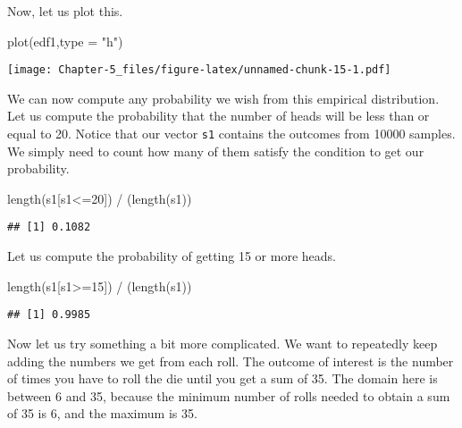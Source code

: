 \documentclass[
]{article}
\newenvironment{Shaded}{\begin{snugshade}}{\end{snugshade}}
\newcommand{\AttributeTok}[1]{\textcolor[rgb]{0.77,0.63,0.00}{#1}}
\newcommand{\DecValTok}[1]{\textcolor[rgb]{0.00,0.00,0.81}{#1}}
\newcommand{\FunctionTok}[1]{\textcolor[rgb]{0.00,0.00,0.00}{#1}}
\newcommand{\NormalTok}[1]{#1}
\newcommand{\SpecialCharTok}[1]{\textcolor[rgb]{0.00,0.00,0.00}{#1}}
\newcommand{\StringTok}[1]{\textcolor[rgb]{0.31,0.60,0.02}{#1}}
\begin{document}
Now, let us plot this.

\begin{Shaded}
\begin{Highlighting}[]
\FunctionTok{plot}\NormalTok{(edf1,}\AttributeTok{type =} \StringTok{"h"}\NormalTok{)}
\end{Highlighting}
\end{Shaded}

\texttt{[image: Chapter-5\_files/figure-latex/unnamed-chunk-15-1.pdf]}

We can now compute any probability we wish from this empirical
distribution. Let us compute the probability that the number of heads
will be less than or equal to 20. Notice that our vector \texttt{s1}
contains the outcomes from 10000 samples. We simply need to count how
many of them satisfy the condition to get our probability.

\begin{Shaded}
\begin{Highlighting}[]
\FunctionTok{length}\NormalTok{(s1[s1}\SpecialCharTok{\textless{}=}\DecValTok{20}\NormalTok{]) }\SpecialCharTok{/}\NormalTok{ (}\FunctionTok{length}\NormalTok{(s1))}
\end{Highlighting}
\end{Shaded}

\begin{verbatim}
## [1] 0.1082
\end{verbatim}

Let us compute the probability of getting 15 or more heads.

\begin{Shaded}
\begin{Highlighting}[]
\FunctionTok{length}\NormalTok{(s1[s1}\SpecialCharTok{\textgreater{}=}\DecValTok{15}\NormalTok{]) }\SpecialCharTok{/}\NormalTok{ (}\FunctionTok{length}\NormalTok{(s1))}
\end{Highlighting}
\end{Shaded}

\begin{verbatim}
## [1] 0.9985
\end{verbatim}

Now let us try something a bit more complicated. We want to repeatedly
keep adding the numbers we get from each roll. The outcome of interest
is the number of times you have to roll the die until you get a sum of
35. The domain here is between 6 and 35, because the minimum number of
rolls needed to obtain a sum of 35 is 6, and the maximum is 35.
\end{document}
